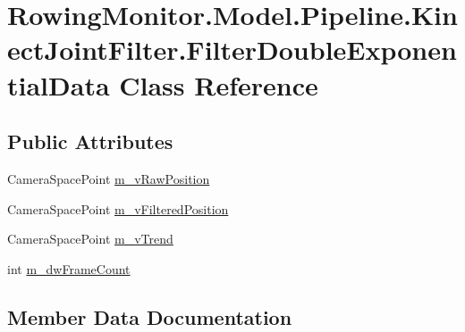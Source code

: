 \hypertarget{class_rowing_monitor_1_1_model_1_1_pipeline_1_1_kinect_joint_filter_1_1_filter_double_exponential_data}{}\section{Rowing\+Monitor.\+Model.\+Pipeline.\+Kinect\+Joint\+Filter.\+Filter\+Double\+Exponential\+Data Class Reference}
\label{class_rowing_monitor_1_1_model_1_1_pipeline_1_1_kinect_joint_filter_1_1_filter_double_exponential_data}
\subsection*{Public Attributes}
\begin{DoxyCompactItemize}
\item 
Camera\+Space\+Point \hyperlink{class_rowing_monitor_1_1_model_1_1_pipeline_1_1_kinect_joint_filter_1_1_filter_double_exponential_data_a4b4b473d842af471a1a255435389942d}{m\+\_\+v\+Raw\+Position}
\item 
Camera\+Space\+Point \hyperlink{class_rowing_monitor_1_1_model_1_1_pipeline_1_1_kinect_joint_filter_1_1_filter_double_exponential_data_a7a0450af4adf9ba3725a9abfc5974b7b}{m\+\_\+v\+Filtered\+Position}
\item 
Camera\+Space\+Point \hyperlink{class_rowing_monitor_1_1_model_1_1_pipeline_1_1_kinect_joint_filter_1_1_filter_double_exponential_data_a1e769a54b1aed666aa8ea9b331b20ff0}{m\+\_\+v\+Trend}
\item 
int \hyperlink{class_rowing_monitor_1_1_model_1_1_pipeline_1_1_kinect_joint_filter_1_1_filter_double_exponential_data_af24ed5a40f362c56649cfc8306c0f643}{m\+\_\+dw\+Frame\+Count}
\end{DoxyCompactItemize}


\subsection{Member Data Documentation}
\mbox{\label{class_rowing_monitor_1_1_model_1_1_pipeline_1_1_kinect_joint_filter_1_1_filter_double_exponential_data_af24ed5a40f362c56649cfc8306c0f643}} 
